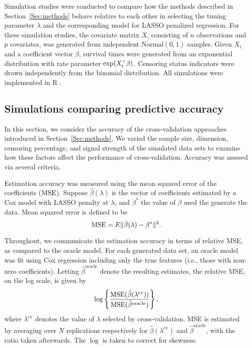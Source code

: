 Simulation studies were conducted to compare how the methods described in Section~\ref{Sec:methods} behave relative to each other in selecting the tuning parameter $\lambda$ and the corresponding model for LASSO penalized regression. For these simulation studies, the covariate matrix $X$, consisting of $n$ observations and $p$ covariates, was generated from independent $\text{Normal}(0, 1)$ samples. Given $X_i$ and a coefficient vector $\beta$, survival times were generated from an exponential distribution with rate parameter $\exp(X_i ^{\scriptscriptstyle\top} \beta)$. Censoring status indicators were drawn independently from the binomial distribution. All simulations were implemented in R \citep{R}. 
   
\subsection{Simulations comparing predictive accuracy}
\label{Sec:accuracy}

In this section, we consider the accuracy of the cross-validation approaches introduced in Section~\ref{Sec:methods}. We varied the sample size, dimension, censoring percentage, and signal strength of the simulated data sets to examine how these factors affect the performance of cross-validation. Accuracy was assesed via several criteria.

Estimation accuracy was measured using the mean squared error of the coefficients ($\textrm{MSE}$). Suppose $\hat{\beta}(\lambda)$ is the vector of coefficients estimated by a Cox model with LASSO penalty at $\lambda$, and $\beta^*$ the value of $\beta$ used the generate the data. Mean squared error is defined to be 
\begin{equation}
\textrm{MSE} = E\| \hat{\beta}(\lambda) - \beta^* \| ^2.
\end{equation}

Throughout, we communicate the estimation accuracy in terms of relative MSE, as compared to the oracle
model.  For each generated data set, an oracle model was fit using Cox regression including only the true features (i.e., those with non-zero coefficients). Letting $\hat{\beta}^{\text{oracle}}$ denote the resulting estimates, the relative MSE, on the log scale, is given by
\begin{equation}
\log\left\{ \frac{\textrm{MSE}(\hat{\beta}(\lambda^{\text{cv}}))}{\textrm{MSE}(\hat{\beta}^{\text{oracle}})} \right\},
\end{equation}
where $\lambda^{\text{cv}}$ denotes the value of $\lambda$ selected by cross-validation. MSE is estimated by averaging over $N$ replications respectively for $\hat{\beta}(\lambda^{\text{cv}})$ and $\hat{\beta}^{\text{oracle}}$, with the ratio taken afterwards. The $\log$ is taken to correct for skewness.

